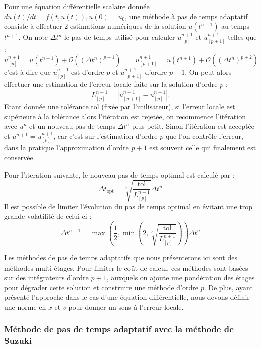 Pour une équation différentielle scalaire donnée $du(t)/dt = f(t, u(t)), u(0)=u_0$, une méthode à pas de temps adaptatif consiste à effectuer 2 estimations numériques de la solution $u(t^{n+1})$ au temps $t^{n+1}$. On note $\Delta t^n$ le pas de temps utilisé pour calculer $u^{n+1}_{[p]}$ et $u^{n+1}_{[p+1]}$ telles que :
$$
  u^{n+1}_{[p]} = u(t^{n+1}) + \mathcal{O}((\Delta t^n)^{p+1}) \qquad u^{n+1}_{[p+1]} = u(t^{n+1}) + \mathcal{O}((\Delta t^n)^{p+2})
$$
c'est-à-dire que $u^{n+1}_{[p]}$ est d'ordre $p$ et $u^{n+1}_{[p+1]}$ d'ordre $p+1$. On peut alors effectuer une estimation de l'erreur locale faite sur la solution d'ordre $p$ :
\begin{equation}
  L_{[p]}^{n+1} =  |u^{n+1}_{[p+1]} - u^{n+1}_{[p]}|. 
  \label{eq:Lerror}
\end{equation}
Etant donnée une tolérance $\text{tol}$ (fixée par l'utilisateur), si l'erreur locale est supérieure à la tolérance alors l'itération est rejetée, on recommence l'itération avec $u^n$ et un nouveau pas de temps $\Delta t^n$ plus petit. Sinon l'itération est acceptée et $u^{n+1} = u^{n+1}_{[p]}$, car c'est sur l'estimation d'ordre $p$ que l'on contrôle l'erreur, dans la pratique l'approximation d'ordre $p+1$ est souvent celle qui finalement est conservée.

Pour l'iteration suivante, le nouveau pas de temps optimal est calculé par :
\begin{equation}
  \Delta t_\text{opt} = \sqrt[p]{\frac{\text{tol}}{L_{[p]}^{n+1}}}\Delta t^n
  \label{eq:dtopt}
\end{equation}
Il est possible de limiter l'évolution du pas de temps optimal en évitant une trop grande volatilité de celui-ci :
$$
  \Delta t^{n+1} = \max\left(\frac{1}{2},\min\left(2,\sqrt[p]{\frac{\text{tol}}{L_{[p]}^{n+1}}}\right)\right)\Delta t^n
$$

Les méthodes de pas de temps adaptatifs que nous présenterons ici sont des méthodes multi-étages. Pour limiter le coût de calcul, ces méthodes sont basées sur des intégrateurs d'ordre $p+1$, auxquels on ajoute une pondération des étages pour dégrader cette solution et construire une méthode d'ordre $p$. De plus, ayant présenté l'approche dans le cas d'une équation différentielle, nous devons définir une norme en $x$ et $v$ pour donner un sens à l'erreur locale.  


\subsubsection{Méthode de pas de temps adaptatif avec la méthode de Suzuki}

